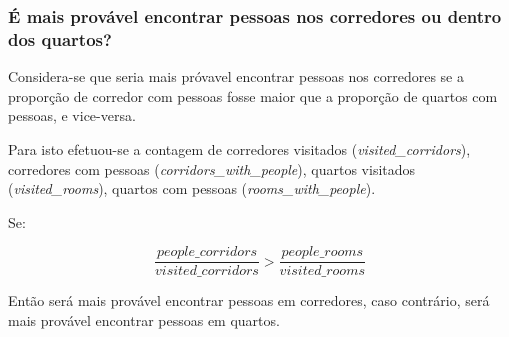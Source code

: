 \subsubsection{É mais provável encontrar pessoas nos corredores ou dentro dos quartos?}
\label{chap2:subsec:q3}

Considera-se que seria mais próvavel encontrar pessoas nos corredores se a proporção de corredor com pessoas fosse maior que a proporção de quartos com pessoas, e vice-versa.

Para isto efetuou-se a contagem de corredores visitados (\textit{visited\_corridors}), corredores com pessoas (\textit{corridors\_with\_people}), quartos visitados (\textit{visited\_rooms}), quartos com pessoas (\textit{rooms\_with\_people}).

Se:

\begin{equation}
    \frac{people\_corridors}{visited\_corridors} > \frac{people\_rooms}{visited\_rooms}
\end{equation}

Então será mais provável encontrar pessoas em corredores, caso contrário, será mais provável encontrar pessoas em quartos.
